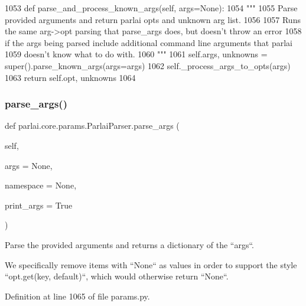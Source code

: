 \begin{DoxyCode}
1053     \textcolor{keyword}{def }parse\_and\_process\_known\_args(self, args=None):
1054         \textcolor{stringliteral}{"""}
1055 \textcolor{stringliteral}{        Parse provided arguments and return parlai opts and unknown arg list.}
1056 \textcolor{stringliteral}{}
1057 \textcolor{stringliteral}{        Runs the same arg->opt parsing that parse\_args does, but doesn't throw an error}
1058 \textcolor{stringliteral}{        if the args being parsed include additional command line arguments that parlai}
1059 \textcolor{stringliteral}{        doesn't know what to do with.}
1060 \textcolor{stringliteral}{        """}
1061         self.args, unknowns = super().parse\_known\_args(args=args)
1062         self.\_process\_args\_to\_opts(args)
1063         \textcolor{keywordflow}{return} self.opt, unknowns
1064 
\end{DoxyCode}
\mbox{\label{classparlai_1_1core_1_1params_1_1ParlaiParser_ad549d75e2808d63fbc5c5d0e30682f18}} 
\subsubsection{\texorpdfstring{parse\+\_\+args()}{parse\_args()}}
{\footnotesize\ttfamily def parlai.\+core.\+params.\+Parlai\+Parser.\+parse\+\_\+args (\begin{DoxyParamCaption}\item[{}]{self,  }\item[{}]{args = {\ttfamily None},  }\item[{}]{namespace = {\ttfamily None},  }\item[{}]{print\+\_\+args = {\ttfamily True} }\end{DoxyParamCaption})}

\begin{DoxyVerb}Parse the provided arguments and returns a dictionary of the ``args``.

We specifically remove items with ``None`` as values in order to support the
style ``opt.get(key, default)``, which would otherwise return ``None``.
\end{DoxyVerb}
 

Definition at line 1065 of file params.\+py.


